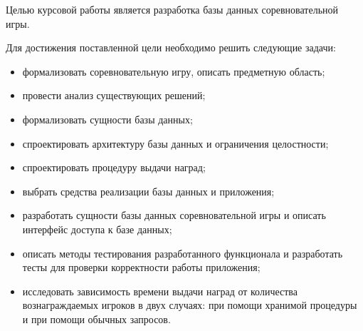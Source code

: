 
Целью курсовой работы является разработка базы данных соревновательной игры.
 
Для достижения поставленной цели необходимо решить следующие задачи:
\begin{itemize}
	\item формализовать соревновательную игру, описать предметную область;
	\item провести анализ существующих решений;
	\item формализовать сущности базы данных;
	\item спроектировать архитектуру базы данных и ограничения целостности;
	\item спроектировать процедуру выдачи наград;
	\item выбрать средства реализации базы данных и приложения;
	\item разработать сущности базы данных соревновательной игры и описать интерфейс доступа к базе данных; 
	\item описать методы тестирования разработанного функционала и разработать тесты для проверки корректности работы приложения;
	\item исследовать зависимость времени выдачи наград от количества вознаграждаемых игроков в двух случаях: при помощи хранимой процедуры и при помощи обычных запросов.
\end{itemize}

\clearpage
